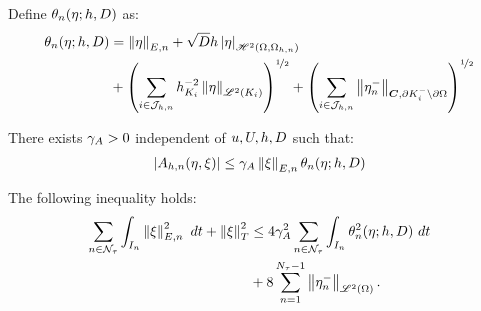 \begin{definition} \label{def:theta}
    Define $\theta_n(\eta; h, D)$ as:
    \begin{align} %
        \theta_n(\eta; h, \Diffusion) &= \left\lVert \eta \right\rVert_{E, n} + \sqrt{\Diffusion} h \left\lvert \eta \right\rvert_{\SpaceHk{2}(\Omega, \Omega_{h, n})} \\
        &+ \left( \sum_{i \in \SpaceTimeIndices} h_{K_i}^{-2} \left\lVert \eta \right\rVert_{\SpaceLp{2}(K_i)} \right)^{\nicefrac12} + \left( \sum_{i \in \SpaceTimeIndices} \left\lVert \eta_n^- \right\rVert_{\Convection, \partial K_i^- \setminus \partial \Omega} \right)^{\nicefrac12}
    \end{align}
\end{definition}

\begin{lemma}
    There exists $\gamma_{A} > 0$ independent of $u, U, h, D$ such that:
    \begin{align}
        \left\lvert A_{h, n}(\eta, \xi) \right\rvert \leq \gamma_{A} \left\lVert \xi \right\rVert_{E, n} \theta_n(\eta; h, D)
    \end{align}
\end{lemma}

\begin{lemma}
    The following inequality holds:
    \begin{align}
        \sum_{n \in \mathcal{N}_{\tau}} \int_{I_n} \left\lVert \xi \right\rVert_{E, n}^2 ~ dt + \left\lVert \xi \right\rVert_T^2 &\leq 4 \gamma_{A}^2 \sum_{n \in \mathcal{N}_{\tau}} \int_{I_n} \theta_n^2(\eta; h, D) ~ dt \\
        &+ 8 \sum_{n = 1}^{N_{\tau} - 1} \left\lVert \eta_n^- \right\rVert_{\mathscr{L}^{2}(\Omega)}. \notag
    \end{align}
\end{lemma}

